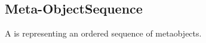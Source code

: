 \subsection{Meta-ObjectSequence}
\label{concept-Meta-ObjectSequence}

A  is representing an ordered sequence of metaobjects.





